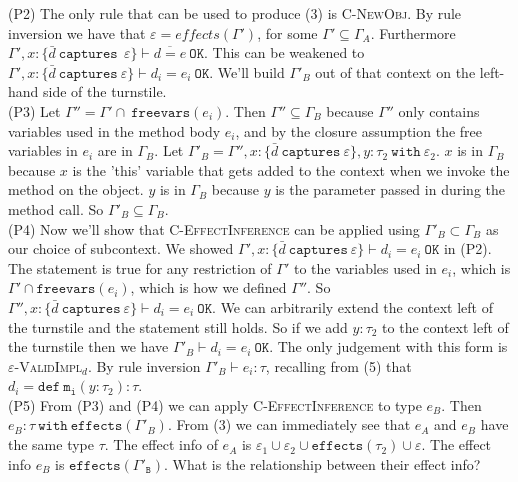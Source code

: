 \documentclass{llncs}
\newcommand{\keywadj}[1]{\mathtt{#1}}
\newcommand{\keyw}[1]{\keywadj{#1}~}
\begin{document}
{{{	\noindent
(P2) The only rule that can be used to produce (3) is \textsc{C-NewObj}. By rule inversion we have that $\varepsilon = effects(\Gamma')$, for some $\Gamma' \subseteq \Gamma_A$. Furthermore $\Gamma', x : \{ \bar d~\keyw{captures}~ \varepsilon \} \vdash \overline{d = e}~\keywadj{OK}$. This can be weakened to $\Gamma', x : \{ \bar d~\keyw{captures}  \varepsilon \} \vdash d_i = e_i~\keywadj{OK}$. We'll build $\Gamma'_B$ out of that context on the left-hand side of the turnstile. \\

	\noindent
(P3) Let $\Gamma'' = \Gamma' \cap ~\keywadj{freevars}(e_i)$. Then $\Gamma'' \subseteq \Gamma_B$ because $\Gamma''$ only contains variables used in the method body $e_i$, and by the closure assumption the free variables in $e_i$ are in $\Gamma_B$. Let $\Gamma'_B = \Gamma'', x : \{ \bar d~\keyw{captures} \varepsilon \}, y : \tau_2~\keyw{with} \varepsilon_2$. $x$ is in $\Gamma_B$ because $x$ is the 'this' variable that gets added to the context when we invoke the method on the object. $y$ is in $\Gamma_B$ because $y$ is the parameter passed in during the method call. So $\Gamma'_B \subseteq \Gamma_B$. \\

	\noindent
(P4) Now we'll show that \textsc{C-EffectInference} can be applied using $\Gamma'_B \subset \Gamma_B$ as our choice of subcontext. We showed $\Gamma', x : \{ \bar d~\keyw{captures}  \varepsilon \} \vdash d_i = e_i~\keywadj{OK}$ in (P2). The statement is true for any restriction of $\Gamma'$ to the variables used in $e_i$, which is $\Gamma' \cap \keywadj{freevars}(e_i)$, which is how we defined $\Gamma''$. So $\Gamma'', x : \{ \bar d~\keyw{captures}  \varepsilon \} \vdash d_i = e_i~\keywadj{OK}$. We can arbitrarily extend the context left of the turnstile and the statement still holds. So if we add $y : \tau_2$ to the context left of the turnstile then we have $\Gamma'_B \vdash d_i = e_i~\keywadj{OK}$. The only judgement with this form is \textsc{$\varepsilon$-ValidImpl$_d$}. By rule inversion $\Gamma'_B \vdash e_i : \tau$, recalling from (5) that $d_i = \keywadj{def~m_i}(y : \tau_2) : \tau$. \\

\noindent
(P5) From (P3) and (P4) we can apply \textsc{C-EffectInference} to type $e_B$. Then $e_B : \tau~\keywadj{with~effects}(\Gamma'_B)$. From (3) we can immediately see that $e_A$ and $e_B$ have the same type $\tau$. The effect info of $e_A$ is $\varepsilon_1 \cup \varepsilon_2 \cup \keywadj{effects}(\tau_2) \cup \varepsilon$. The effect info $e_B$ is $\keywadj{effects(\Gamma'_B)}$. What is the relationship between their effect info? \\

}}}
\end{document}
